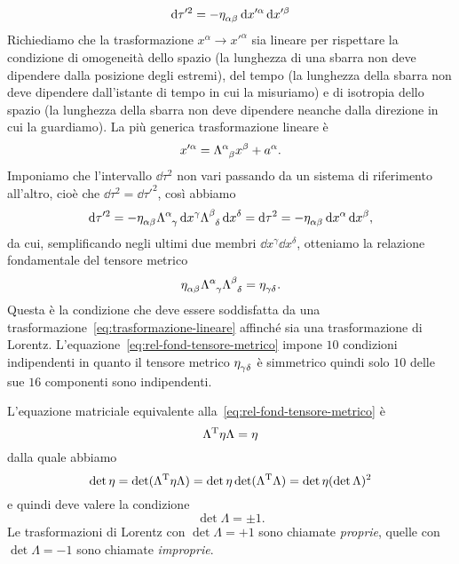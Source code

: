 \begin{equation}
  \dd \tau'^{2} = -\tensor{\eta}{_{\alpha\beta}}\dd x'^{\alpha}\dd x'^{\beta}
\end{equation}
Richiediamo che la trasformazione $x^{\alpha} \to x'^{\alpha}$ sia lineare
per rispettare la condizione di omogeneità dello spazio (la lunghezza di una
sbarra non deve dipendere dalla posizione degli estremi), del tempo (la
lunghezza della sbarra non deve dipendere dall'istante di tempo in cui la
misuriamo) e di isotropia dello spazio (la lunghezza della sbarra non deve
dipendere neanche dalla direzione in cui la guardiamo).  La più generica
trasformazione lineare è
\begin{equation}
  \label{eq:trasformazione-lineare}
  x'^{\alpha} = \tensor{\Lambda}{^{\alpha}_{\beta}}x^{\beta} + a^{\alpha}.
\end{equation}
Imponiamo che l'intervallo $\dd \tau^{2}$ non vari passando da un sistema di
riferimento all'altro, cioè che $\dd \tau^{2} = \dd \tau'^{2}$, così abbiamo
\begin{equation}
  \dd \tau'^{2} = -\tensor{\eta}{_{\alpha\beta}}
  \tensor{\Lambda}{^{\alpha}_{\gamma}} \dd x^{\gamma}
  \tensor{\Lambda}{^{\beta}_{\delta}} \dd x^{\delta} = \dd \tau^{2} =
  -\tensor{\eta}{_{\alpha\beta}} \dd x^{\alpha} \dd x^{\beta},
\end{equation}
da cui, semplificando negli ultimi due membri $\dd x^{\gamma}\dd x^{\delta}$,
otteniamo la relazione fondamentale del tensore metrico
\begin{equation}
  \label{eq:rel-fond-tensore-metrico}
  \tensor{\eta}{_{\alpha\beta}} \tensor{\Lambda}{^{\alpha}_{\gamma}}
  \tensor{\Lambda}{^{\beta}_{\delta}} = \tensor{\eta}{_{\gamma\delta}}.
\end{equation}
Questa è la condizione che deve essere soddisfatta da una
trasformazione~\eqref{eq:trasformazione-lineare} affinché sia una trasformazione
di Lorentz.  L'equazione~\eqref{eq:rel-fond-tensore-metrico} impone $10$
condizioni indipendenti in quanto il tensore metrico
$\tensor{\eta}{_{\gamma\delta}}$ è simmetrico quindi solo $10$ delle sue $16$
componenti sono indipendenti.

L'equazione matriciale equivalente alla~\eqref{eq:rel-fond-tensore-metrico} è
\begin{equation}
  \Lambda^{\textup{T}}\eta\Lambda = \eta
\end{equation}
dalla quale abbiamo
\begin{equation}
  \det\eta = \det(\Lambda^{\textup{T}}\eta\Lambda) = \det\eta
  \det(\Lambda^{\textup{T}}\Lambda) = \det\eta (\det\Lambda)^{2}
\end{equation}
e quindi deve valere la condizione
\begin{equation}
  \det\Lambda = \pm 1.
\end{equation}
Le trasformazioni di Lorentz con $\det\Lambda = +1$ sono chiamate
\emph{proprie}, quelle con $\det\Lambda = -1$ sono chiamate \emph{improprie}.

